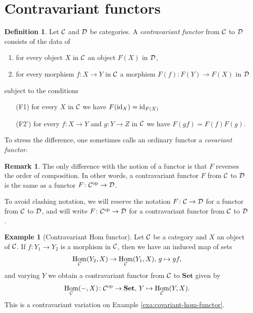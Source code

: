 \documentclass[11pt]{amsbook}
\DeclareMathOperator\Hom{Hom}
\def\id{{\rm id}}
\def\opp{\mathrm{op}}
\def\Set{\mathbf{Set}}
\theoremstyle{plain}
\theoremstyle{definition}
\newtheorem{definition}[theorem]{Definition}
\newtheorem{example}[theorem]{Example}
\newtheorem{remark}[theorem]{Remark}
\begin{document}
\section{Contravariant functors}

\begin{definition}
Let ${\mathcal{C}}$ and ${\mathcal{D}}$ be categories. A \emph{contravariant functor} from ${\mathcal{C}}$ to ${\mathcal{D}}$ consists of the
data of
\begin{enumerate}
\item for every object $X$ in ${\mathcal{C}}$ an object $F(X)$ in ${\mathcal{D}}$,
\item for every morphism $f\colon X\to Y$ in ${\mathcal{C}}$ a morphism $F(f)\colon F(Y) \to F(X)$ in ${\mathcal{D}}$
\end{enumerate}
subject to the conditions
\begin{enumerate}
\item[(F1)] for every $X$ in ${\mathcal{C}}$ we have $F(\id_X) = \id_{F(X)}$
\item[(F2')] for every $f\colon X\to Y$ and $g\colon Y\to Z$ in ${\mathcal{C}}$ we have $F(gf)=F(f)F(g)$.
\end{enumerate}
\end{definition}

To stress the difference, one sometimes calls an ordinary functor a \emph{covariant functor}.


\begin{remark}
The only difference with the notion of a functor is that $F$ reverses the order of composition. In other words, a contravariant functor $F$ from ${\mathcal{C}}$ to ${\mathcal{D}}$ is the same as a functor $F\colon \cC^\opp \to \cD$. 

To avoid clashing notation, we will reserve the notation $F\colon {\mathcal{C}} \to {\mathcal{D}}$ for a functor from ${\mathcal{C}}$ to ${\mathcal{D}}$, and will write $F\colon \cC^\opp \to \cD$ for a contravariant functor from ${\mathcal{C}}$ to ${\mathcal{D}}$.
\end{remark}

\begin{example}[Contravariant Hom functor]\label{exa:contravariant-hom-functor}
Let ${\mathcal{C}}$ be a category and $X$ an object of ${\mathcal{C}}$. If $f\colon Y_1\to Y_2$ is a morphism in ${\mathcal{C}}$, then we have an induced map of 
sets
\[
	\Hom_\cC(Y_2,X) \to \Hom_\cC(Y_1,X),\, g \mapsto gf,
\]
and varying $Y$ we obtain a contravariant functor from ${\mathcal{C}}$ to $\Set$ given by
\[
	\Hom_\cC(-,X)\colon \cC^\opp \to \Set,\,Y \mapsto \Hom_\cC(Y,X).
\]
This is a contravariant variation on Example \ref{exa:covariant-hom-functor}.
\end{example}
\end{document}
